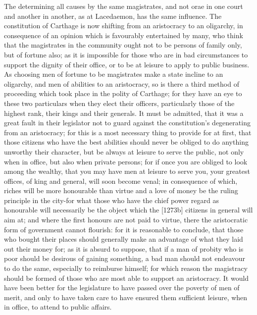 The determining all causes by the same magistrates, and not orae in one
court and another in another, as at Lacedaemon, has the same influence.
The constitution of Carthage is now shifting from an aristocracy to an
oligarchy, in consequence of an opinion which is favourably entertained by
many, who think that the magistrates in the community ought not to be
persons of family only, but of fortune also; as it is impossible for those
who are in bad circumstances to support the dignity of their office, or to
be at leisure to apply to public business. As choosing men of fortune to
be magistrates make a state incline to an oligarchy, and men of abilities
to an aristocracy, so is there a third method of proceeding which took
place in the polity of Carthage; for they have an eye to these two
particulars when they elect their officers, particularly those of the
highest rank, their kings and their generals. It must be admitted, that it
was a great fault in their legislator not to guard against the
constitution's degenerating from an aristocracy; for this is a most
necessary thing to provide for at first, that those citizens who have the
best abilities should never be obliged to do anything unworthy their
character, but be always at leisure to serve the public, not only when in
office, but also when private persons; for if once you are obliged to look
among the wealthy, that you may have men at leisure to serve you, your
greatest offices, of king and general, will soon become venal; in
consequence of which, riches will be more honourable than virtue and a
love of money be the ruling principle in the city-for what those who have
the chief power regard as honourable will necessarily be the object which
the [1273b] citizens in general will aim at; and where the first honours
are not paid to virtue, there the aristocratic form of government cannot
flourish: for it is reasonable to conclude, that those who bought their
places should generally make an advantage of what they laid out their
money for; as it is absurd to suppose, that if a man of probity who is
poor should be desirous of gaining something, a bad man should not
endeavour to do the same, especially to reimburse himself; for which
reason the magistracy should be formed of those who are most able to
support an aristocracy. It would have been better for the legislature to
have passed over the poverty of men of merit, and only to have taken care
to have ensured them sufficient leisure, when in office, to attend to
public affairs.

